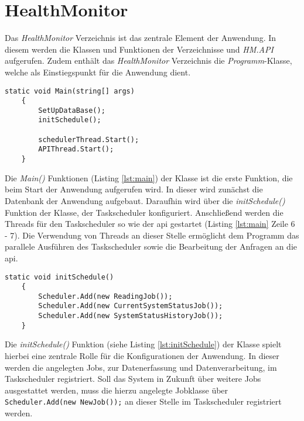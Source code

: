 \section{HealthMonitor}
Das \textit{HealthMonitor} Verzeichnis ist das zentrale Element der Anwendung. In diesem werden die Klassen und Funktionen der Verzeichnisse  und \textit{HM.API} aufgerufen. Zudem enthält das \textit{HealthMonitor} Verzeichnis die \textit{Programm}-Klasse, welche als Einstiegspunkt für die Anwendung dient.\\
\begin{lstlisting}[caption={Einstiegspunkt der Anwendung}, label={lst:main}]
    static void Main(string[] args) 
    {
        SetUpDataBase();
        initSchedule();
        
        schedulerThread.Start();
        APIThread.Start();
    }
\end{lstlisting}
Die \textit{Main()} Funktionen (Listing \ref{lst:main}) der Klasse ist die erste Funktion, die beim Start der Anwendung aufgerufen wird. In dieser wird zunächst die Datenbank der Anwendung aufgebaut. Daraufhin wird über die \textit{initSchedule()} Funktion der Klasse, der Taskscheduler konfiguriert. Anschließend werden die Threads für den Taskscheduler so wie der \ac{api} gestartet (Listing \ref{lst:main} Zeile 6 - 7). Die Verwendung von Threads an dieser Stelle ermöglicht dem Programm das parallele Ausführen des Taskscheduler sowie die Bearbeitung der Anfragen an die \ac{api}.
\begin{lstlisting}[caption={Registrierung der Jobs im Taskscheduler}, label={lst:initSchedule}]
    static void initSchedule() 
    {
        Scheduler.Add(new ReadingJob());
        Scheduler.Add(new CurrentSystemStatusJob());
        Scheduler.Add(new SystemStatusHistoryJob());
    }
\end{lstlisting}
Die \textit{initSchedule()} Funktion (siehe Listing \ref{lst:initSchedule}) der Klasse spielt hierbei eine zentrale Rolle für die Konfigurationen der Anwendung. In dieser werden die angelegten Jobs, zur Datenerfassung und Datenverarbeitung, im Taskscheduler registriert. Soll das System in Zukunft über weitere Jobs ausgestattet werden, muss die hierzu angelegte Jobklasse über \lstinline$Scheduler.Add(new NewJob());$ an dieser Stelle im Taskscheduler registriert werden.   